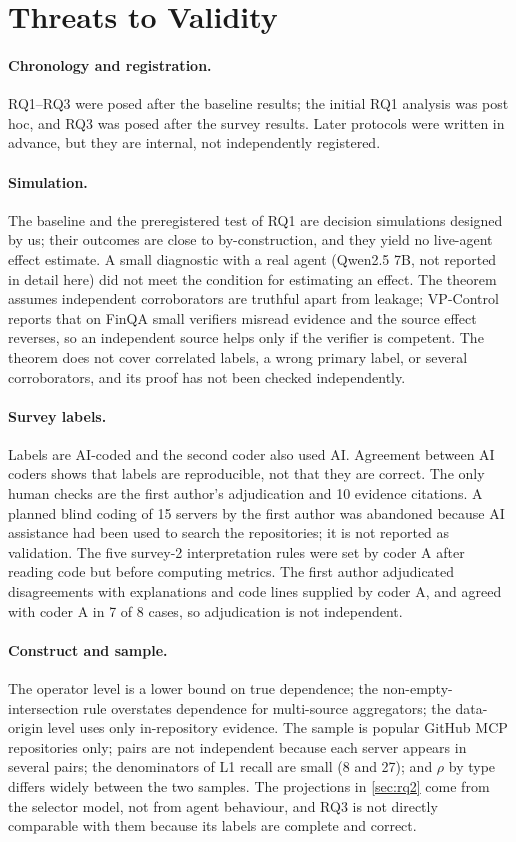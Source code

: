 \section{Threats to Validity}\label{sec:threats}

\paragraph{Chronology and registration.} RQ1--RQ3 were posed after the baseline results; the initial RQ1 analysis was post hoc, and RQ3 was posed after the survey results. Later protocols were written in advance, but they are internal, not independently registered.

\paragraph{Simulation.} The baseline and the preregistered test of RQ1 are decision simulations designed by us; their outcomes are close to by-construction, and they yield no live-agent effect estimate. A small diagnostic with a real agent (Qwen2.5 7B, not reported in detail here) did not meet the condition for estimating an effect. The theorem assumes independent corroborators are truthful apart from leakage; VP-Control reports that on FinQA small verifiers misread evidence and the source effect reverses, so an independent source helps only if the verifier is competent. The theorem does not cover correlated labels, a wrong primary label, or several corroborators, and its proof has not been checked independently.

\paragraph{Survey labels.} Labels are AI-coded and the second coder also used AI. Agreement between AI coders shows that labels are reproducible, not that they are correct. The only human checks are the first author's adjudication and 10 evidence citations. A planned blind coding of 15 servers by the first author was abandoned because AI assistance had been used to search the repositories; it is not reported as validation. The five survey-2 interpretation rules were set by coder A after reading code but before computing metrics. The first author adjudicated disagreements with explanations and code lines supplied by coder A, and agreed with coder A in 7 of 8 cases, so adjudication is not independent.

\paragraph{Construct and sample.} The operator level is a lower bound on true dependence; the non-empty-intersection rule overstates dependence for multi-source aggregators; the data-origin level uses only in-repository evidence. The sample is popular GitHub MCP repositories only; pairs are not independent because each server appears in several pairs; the denominators of L1 recall are small (8 and 27); and $\rho$ by type differs widely between the two samples. The projections in \cref{sec:rq2} come from the selector model, not from agent behaviour, and RQ3 is not directly comparable with them because its labels are complete and correct.

